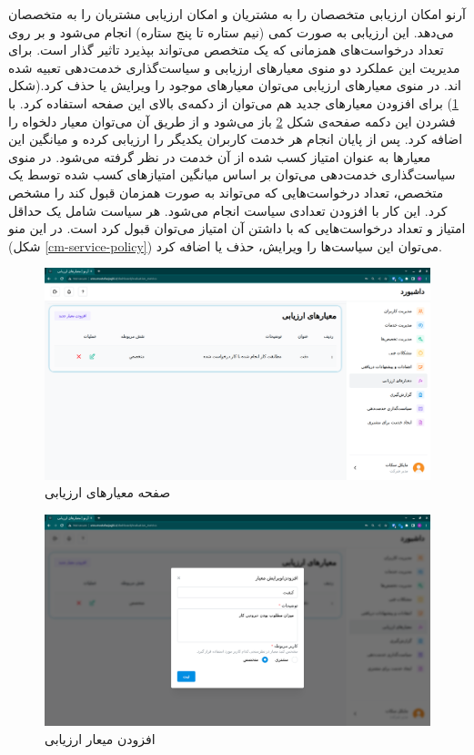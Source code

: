 \FloatBarrier

آرنو امکان ارزیابی متخصصان را به مشتریان و امکان ارزیابی مشتریان را به متخصصان می‌دهد.
این ارزیابی به صورت کمی (نیم ستاره تا پنج ستاره) انجام می‌شود و بر روی تعداد درخواست‌های همزمانی که یک متخصص می‌تواند بپذیرد تاثیر گذار است.
برای مدیریت این عملکرد دو منوی معیارهای ارزیابی و سیاست‌گذاری خدمت‌دهی تعبیه شده اند.
در منوی معیارهای ارزیابی می‌توان معیارهای موجود را ویرایش یا حذف کرد.(شکل \ref{cm-evaluation-metrics})
برای افزودن معیارهای جدید هم می‌توان از دکمه‌ی بالای این صفحه استفاده کرد.
با فشردن این دکمه صفحه‌ی شکل \ref{cm-add-evaluation-metric} باز می‌شود و از طریق آن می‌توان معیار دلخواه را اضافه کرد.
پس از پایان انجام هر خدمت کاربران یکدیگر را ارزیابی کرده و میانگین این معیارها به عنوان امتیاز کسب شده از آن خدمت در نظر گرفته می‌شود.
در منوی سیاست‌گذاری خدمت‌دهی می‌توان بر اساس میانگین امتیازهای کسب شده توسط یک متخصص، تعداد درخواست‌هایی که می‌تواند به صورت همزمان قبول کند را مشخص کرد.
این کار با افزودن تعدادی سیاست انجام می‌شود.
هر سیاست شامل یک حداقل امتیاز و تعداد درخواست‌هایی که با داشتن آن امتیاز می‌توان قبول کرد است.
در این منو (شکل \ref{cm-service-policy}) می‌توان این سیاست‌ها را ویرایش، حذف یا اضافه کرد.

\begin{figure}[h]
	\centering
	\includegraphics[width=\textwidth]{figs/user-guide/cm-evaluation-metrics}
	\caption{صفحه معیارهای ارزیابی}
	\label{cm-evaluation-metrics}
\end{figure}

\begin{figure}[h]
	\centering
	\includegraphics[width=\textwidth]{figs/user-guide/cm-add-evaluation-metric}
	\caption{افزودن میعار ارزیابی}
	\label{cm-add-evaluation-metric}
\end{figure}

